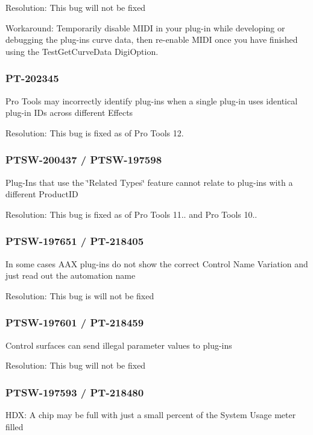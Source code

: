 Resolution\+: This bug will not be fixed

Workaround\+: Temporarily disable M\+I\+D\+I in your plug-\/in while developing or debugging the plug-\/in\textquotesingle{}s curve data, then re-\/enable M\+I\+D\+I once you have finished using the {\ttfamily Test\+Get\+Curve\+Data} Digi\+Option.\hypertarget{a00374_PT-202345}{}\subsubsection{P\+T-\/202345}\label{a00374_PT-202345}
Pro Tools may incorrectly identify plug-\/ins when a single plug-\/in uses identical plug-\/in I\+Ds across different Effects

Resolution\+: This bug is fixed as of Pro Tools 12.\hypertarget{a00374_PTSW-200437}{}\subsubsection{P\+T\+S\+W-\/200437 / P\+T\+S\+W-\/197598}\label{a00374_PTSW-200437}
Plug-\/\+Ins that use the \char`\"{}\+Related Types\char`\"{} feature cannot relate to plug-\/ins with a different Product\+I\+D

Resolution\+: This bug is fixed as of Pro Tools 11.. and Pro Tools 10..\hypertarget{a00374_PTSW-197651}{}\subsubsection{P\+T\+S\+W-\/197651 / P\+T-\/218405}\label{a00374_PTSW-197651}
In some cases A\+A\+X plug-\/ins do not show the correct Control Name Variation and just read out the automation name

Resolution\+: This bug is will not be fixed\hypertarget{a00374_PTSW-197601}{}\subsubsection{P\+T\+S\+W-\/197601 / P\+T-\/218459}\label{a00374_PTSW-197601}
Control surfaces can send illegal parameter values to plug-\/ins

Resolution\+: This bug will not be fixed\hypertarget{a00374_PTSW-197593}{}\subsubsection{P\+T\+S\+W-\/197593 / P\+T-\/218480}\label{a00374_PTSW-197593}
H\+D\+X\+: A chip may be full with just a small percent of the System Usage meter filled

